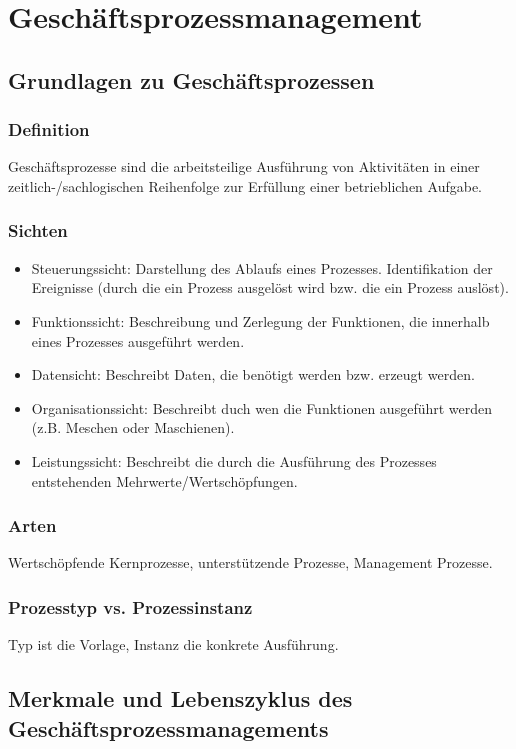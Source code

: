 \section{Geschäftsprozessmanagement}

\subsection{Grundlagen zu Geschäftsprozessen}
    \subsubsection*{Definition}
        Geschäftsprozesse sind die arbeitsteilige Ausführung von Aktivitäten in einer zeitlich-/sachlogischen Reihenfolge zur Erfüllung einer betrieblichen Aufgabe.
    \subsubsection*{Sichten}
        \begin{itemize}
            \item Steuerungssicht: Darstellung des Ablaufs eines Prozesses. Identifikation der Ereignisse (durch die ein Prozess ausgelöst wird bzw. die ein Prozess auslöst).
            \item Funktionssicht: Beschreibung und Zerlegung der Funktionen, die innerhalb eines Prozesses ausgeführt werden.
            \item Datensicht: Beschreibt Daten, die benötigt werden bzw. erzeugt werden.
            \item Organisationssicht: Beschreibt duch wen die Funktionen ausgeführt werden (z.B. Meschen oder Maschienen).
            \item Leistungssicht: Beschreibt die durch die Ausführung des Prozesses entstehenden Mehrwerte/Wertschöpfungen.
        \end{itemize}
    \subsubsection*{Arten}
        Wertschöpfende Kernprozesse, unterstützende Prozesse, Management Prozesse.
    \subsubsection*{Prozesstyp vs. Prozessinstanz}
        Typ ist die Vorlage, Instanz die konkrete Ausführung.

\subsection{Merkmale und Lebenszyklus des Geschäftsprozessmanagements}
